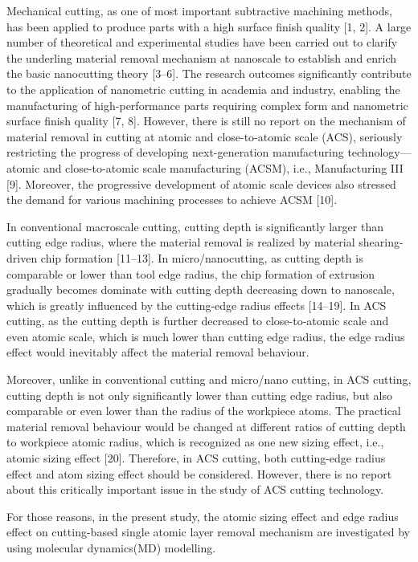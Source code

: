 \documentclass{article}
\begin{document}
Mechanical cutting, as one of most important subtractive machining methods, has been applied to produce parts with a high surface finish quality [1, 2]. A large number of theoretical and experimental studies have been carried out to clarify the underling material removal mechanism at nanoscale to establish and enrich the basic nanocutting theory [3–6]. The research outcomes significantly contribute to the application of nanometric cutting in academia and industry, enabling the manufacturing of high-performance parts requiring complex form and nanometric surface finish quality [7, 8]. However, there is still no report on the mechanism of material removal in cutting at atomic and close-to-atomic scale (ACS), seriously restricting the progress of developing next-generation manufacturing technology—atomic and close-to-atomic scale manufacturing (ACSM), i.e., Manufacturing III [9]. Moreover, the progressive development of atomic scale devices also stressed the demand for various machining processes to achieve ACSM [10].

In conventional macroscale cutting, cutting depth is significantly larger than cutting edge radius, where the material removal is realized by material shearing-driven chip formation [11–13]. In micro/nanocutting, as cutting depth is comparable or lower than tool edge radius, the chip formation of extrusion gradually becomes dominate with cutting depth decreasing down to nanoscale, which is greatly influenced by the cutting-edge radius effects [14–19]. In ACS cutting, as the cutting depth is further decreased to close-to-atomic scale and even atomic scale, which is much lower than cutting edge radius, the edge radius effect would inevitably affect the material removal behaviour.

Moreover, unlike in conventional cutting and micro/nano cutting, in ACS cutting, cutting depth is not only significantly lower than cutting edge radius, but also comparable or even lower than the radius of the workpiece atoms. The practical material removal behaviour would be changed at different ratios of cutting depth to workpiece atomic radius, which is recognized as one new sizing effect, i.e., atomic sizing effect [20]. Therefore, in ACS cutting, both cutting-edge radius effect and atom sizing effect should be considered. However, there is no report about this critically important issue in the study of ACS cutting technology.

For those reasons, in the present study, the atomic sizing effect and edge radius effect on cutting-based single atomic layer removal mechanism are investigated by using molecular dynamics(MD) modelling.
\end{document}
